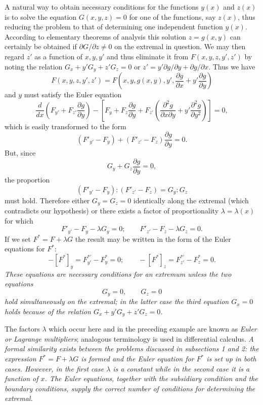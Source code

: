 A natural way to obtain necessary conditions for the functions $y(x)$ and $z(x)$ is to solve the equation $G(x,y,z)=0$ for one of the functions, say $z(x)$, thus reducing the problem to that of determining one independent function $y(x)$. According to elementary theorems of analysis this solution $z=g(x,y)$ can certainly be obtained if $\partial G/\partial z\ne0$ on the extremal in question. We may then regard $z'$ as a function of $x,y,y'$ and thus eliminate it from $F(x,y,z,y',z')$ by noting the relation $G_x+y'G_y+z'G_z=0$ or $z'=y'\partial g/\partial y+\partial g/\partial x$. Thus we have
\[
F(x,y,z,y',z')=F\left(x,y,g(x,y),y',\frac{\partial g}{\partial x}+y'\frac{\partial g}{\partial y}\right)
\]
and $y$ must satisfy the Euler equation
\[
\frac{d}{dx}\left(F_{y'}+F_{z'}\frac{\partial g}{\partial y}\right)-
\left[F_y+F_z\frac{\partial g}{\partial y}+F_{z'}\left(\frac{\partial^2g}{\partial x\partial y}+y'\frac{\partial^2g}{\partial y^2}\right)\right]=0,
\]
which is easily transformed to the form
\[
(F'_{y'}-F_y)+(F'_{z'}-F_z)\frac{\partial g}{\partial y}=0.
\]
But, since
\[
G_y+G_z\frac{\partial g}{\partial y}=0,
\]
the proportion
\[
(F'_{y'}-F_y):(F'_{z'}-F_z)=G_y:G_z
\]
must hold. Therefore either $G_y=G_z=0$ identically along the extremal (which contradicts our hypothesis) or there exists a factor of proportionality $\lambda=\lambda(x)$ for which
\begin{equation}\tag{55}
F'_{y'}-F_y-\lambda G_y=0;\qquad
F'_{z'}-F_z-\lambda G_z=0.
\end{equation}
If we set $F^*=F+\lambda G$ the result may be written in the form of the Euler equations for $F^*$:
\[
-[F^*]_y=F_{y'}^{*\prime}-F_y^*=0;\qquad
-[F^*]_z=F_{z'}^{*\prime}-F_z^*=0.
\]
\emph{These equations are necessary conditions for an extremum unless the two equations
\[
G_y=0,\qquad G_z=0
\]
hold simultaneously on the extremal; in the latter case the third equation $G_x=0$ holds because of the relation $G_x+y'G_y+z'G_z=0$.}

The factors $\lambda$ which occur here and in the preceding example are known as \emph{Euler or Lagrange multipliers}; analogous terminology is used in differential calculus. \emph{A formal similarity exists between the problems discussed in subsections 1 and 2: the expression $F^*=F+\lambda G$ is formed and the Euler equation for $F^*$ is set up in both cases. However, in the first case $\lambda$ is a constant while in the second case it is a function of $x$. The Euler equations, together with the subsidiary condition and the boundary conditions, supply the correct number of conditions for determining the extremal.}

